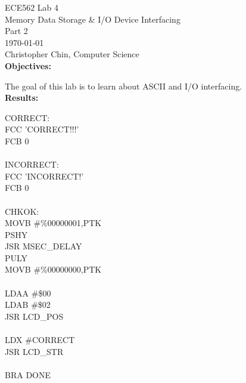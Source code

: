 \documentclass[11pt,a4paper]{article}
\begin{document}
{\parindent0pt
ECE562 Lab 4\\
Memory Data Storage \& I/O Device Interfacing\\
Part 2\\
\today\\
Christopher Chin, Computer Science\\

\textbf{Objectives:}

The goal of this lab is to learn about ASCII and I/O interfacing.\\

\textbf{Results:}

CORRECT:\\
\hspace*{1.5cm}FCC	'CORRECT!!!'\\
\hspace*{1.5cm}FCB	0\\
\\
INCORRECT:\\
\hspace*{1.5cm}FCC	'INCORRECT!'\\
\hspace*{1.5cm}FCB	0\\
\\
CHKOK:\\
\hspace*{1.5cm}MOVB    \#\%00000001,PTK\\
\hspace*{1.5cm}PSHY\\
\hspace*{1.5cm}JSR      MSEC\_DELAY\\
\hspace*{1.5cm}PULY\\
\hspace*{1.5cm}MOVB    \#\%00000000,PTK\\
\\
\hspace*{1.5cm}LDAA	\#\$00\\
\hspace*{1.5cm}LDAB	\#\$02\\
\hspace*{1.5cm}JSR	LCD\_POS\\
\\
\hspace*{1.5cm}LDX	\#CORRECT\\
\hspace*{1.5cm}JSR	LCD\_STR\\
\\
\hspace*{1.5cm}BRA 	DONE\\
}
\end{document}
